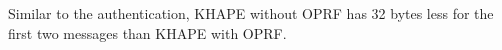 ﻿\documentclass[../report.tex]{subfiles}
\begin{document}
Similar to the authentication, KHAPE without OPRF has 32 bytes less for the first two messages than KHAPE with OPRF.









\end{document}
